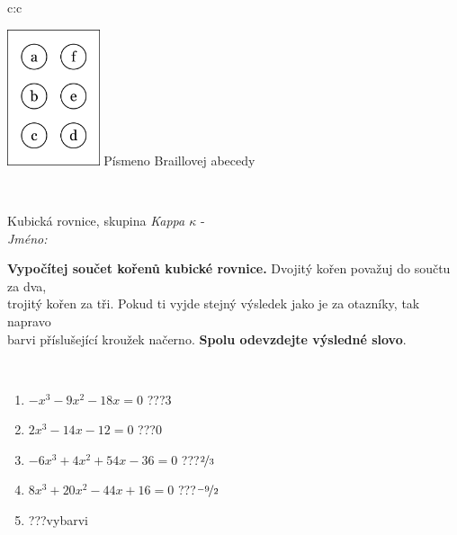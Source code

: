 \documentclass[10pt]{report}
\begin{document}
\begin{tabular}{c:c}
\begin{minipage}[c][104.5mm][t]{0.5\linewidth}
\begin{center}
\begin{minipage}{0.20\linewidth}
\begin{center}
\includegraphics[height=40mm]{../images/braille.png}
{\small Písmeno Braillovej abecedy}
\end{center}
\end{minipage}
\end{center}
\end{minipage}
\\ \hdashline
\begin{minipage}[c][104.5mm][t]{0.5\linewidth}
\begin{center}
\vspace{7mm}
{\huge Kubická rovnice, skupina \textit{Kappa $\kappa$} -}\\[5mm]
\textit{Jméno:}\phantom{xxxxxxxxxxxxxxxxxxxxxxxxxxxxxxxxxxxxxxxxxxxxxxxxxxxxxxxxxxxxxxxxx}\\[5mm]
\begin{minipage}{0.95\linewidth}
\begin{center}
\textbf{Vypočítej součet kořenů kubické rovnice.} Dvojitý kořen považuj do součtu za dva,\\trojitý kořen za tři. Pokud ti vyjde stejný výsledek jako je za otazníky, tak napravo\\barvi příslušející kroužek načerno. \textbf{Spolu odevzdejte výsledné slovo}.
\end{center}
\end{minipage}
\\[1mm]
\begin{minipage}{0.79\linewidth}
\begin{center}
\begin{varwidth}{\linewidth}
\begin{enumerate}
\Large
\item $-x^3-9x^2-18x=0$\quad \dotfill\; ???\;\dotfill \quad $3$
\item $2x^3-14x-12=0$\quad \dotfill\; ???\;\dotfill \quad $0$
\item $-6x^3+4x^2+54x-36=0$\quad \dotfill\; ???\;\dotfill \quad $\nicefrac{2}{3}$
\item $8x^3+20x^2-44x+16=0$\quad \dotfill\; ???\;\dotfill \quad $\nicefrac{-9}{2}$
\item \quad \dotfill\; ???\;\dotfill \quad vybarvi

\end{enumerate}
\end{varwidth}
\end{center}
\end{minipage}
\end{center}
\end{minipage}
\end{tabular}
\end{document}
